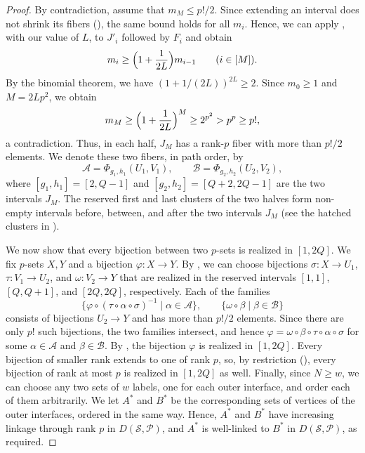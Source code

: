 \documentclass[fontsize=12pt,leading=14pt]{fullpaper}
\newcommand{\Acal}{\mathcal{A}}
\newcommand{\Bcal}{\mathcal{B}}
\newcommand{\Pcal}{\mathcal{P}}
\newcommand{\Scal}{\mathcal{S}}
\begin{document}
\begin{proof}
  By contradiction, assume that $m_M\le p!/2$.
  Since extending an interval does not shrink its fibers (), the same bound holds for all $m_i$.
  Hence, we can apply , with our value of $L$, to $J'_i$ followed by $F_i$ and obtain
  \[
    m_i\ge\Bigl(1+\frac1{2L}\Bigr)m_{i-1}\qquad(i\in[M]).
  \]
  By the binomial theorem, we have $(1+1/(2L))^{2L}\ge2$.
  Since $m_0\ge1$ and $M=2Lp^2$, we obtain
  \[
    m_M\ge\Bigl(1+\frac1{2L}\Bigr)^M
    \ge2^{p^2}>p^p\ge p!,
  \]
  a contradiction.
  Thus, in each half, $J_M$ has a rank-$p$ fiber with more than $p!/2$ elements.
  We denote these two fibers, in path order, by
  \[
    \Acal=\Phi_{g_1,h_1}(U_1,V_1),\qquad
    \Bcal=\Phi_{g_2,h_2}(U_2,V_2),
  \]
  where $[g_1,h_1]=[2,Q-1]$ and $[g_2,h_2]=[Q+2,2Q-1]$ are the two intervals $J_M$.
  The reserved first and last clusters of the two halves form non-empty intervals before, between, and after the two intervals $J_M$ (see the hatched clusters in ).

  We now show that every bijection between two $p$-sets is realized in $[1,2Q]$.
  We fix $p$-sets $X,Y$ and a bijection $\varphi\colon X\to Y$.
  By , we can choose bijections $\sigma\colon X\to U_1$, $\tau\colon V_1\to U_2$, and $\omega\colon V_2\to Y$ that are realized in the reserved intervals $[1,1]$, $[Q,Q+1]$, and $[2Q,2Q]$, respectively.
  Each of the families
  \[
    \{\varphi\circ(\tau\circ\alpha\circ\sigma)^{-1}\mid\alpha\in\Acal\},
    \qquad \{\omega\circ\beta\mid\beta\in\Bcal\}
  \]
  consists of bijections $U_2\to Y$ and has more than $p!/2$ elements.
  Since there are only $p!$ such bijections, the two families intersect, and hence $\varphi=\omega\circ\beta\circ\tau\circ\alpha\circ\sigma$ for some $\alpha\in\Acal$ and $\beta\in\Bcal$.
  By , the bijection $\varphi$ is realized in $[1,2Q]$.
  Every bijection of smaller rank extends to one of rank $p$, so, by restriction (), every bijection of rank at most $p$ is realized in $[1,2Q]$ as well.
  Finally, since $N\ge w$, we can choose any two sets of $w$ labels, one for each outer interface, and order each of them arbitrarily.
  We let $A^*$ and $B^*$ be the corresponding sets of vertices of the outer interfaces, ordered in the same way.
  Hence, $A^*$ and $B^*$ have increasing linkage through rank $p$ in $D(\Scal,\Pcal)$, and $A^*$ is well-linked to $B^*$ in $D(\Scal,\Pcal)$, as required.
\end{proof}
\end{document}
